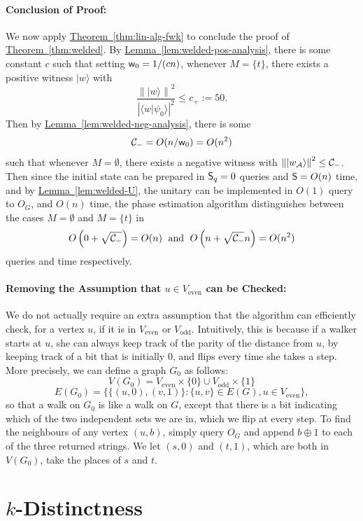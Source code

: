 \documentclass{article}
\newcommand{\thm}[1]{\hyperref[thm:#1]{Theorem~\ref*{thm:#1}}}
\newcommand{\lem}[1]{\hyperref[lem:#1]{Lemma~\ref*{lem:#1}}}
\def\ket#1{{\lvert}#1\rangle}
\renewcommand{\>}{\rangle}
\newcommand{\<}{\langle}
\renewcommand{\(}{\left(}
\renewcommand{\)}{\right)}
\def\braket#1#2{{{\langle}#1\vert}#2\rangle}
\def\norm#1{\left\| #1 \right\|}
\def\w{{\sf w}}
\begin{document}
\paragraph{Conclusion of Proof:} We now apply \thm{lin-alg-fwk} to conclude the proof of \thm{welded}. By \lem{welded-pos-analysis}, there is some constant $c$ such that setting $\w_0={1}/(cn)$, whenever $M=\{t\}$, there exists a positive witness $\ket{w}$ with 
$$\frac{\norm{\ket{w}}^2}{|\braket{w}{\psi_0}|^2}\leq c_+:=50.$$
Then by \lem{welded-neg-analysis}, there is some 
$${\cal C}_-=O(n/\w_0)=O(n^2)$$
such that whenever $M=\emptyset$, there exists a negative witness with
$\norm{\ket{w_{\cal A}}}^2 \leq {\cal C}_-$.
Then since the initial state can be prepared in ${\sf S}_q=0$ queries and ${\sf S}=O(n)$ time, and by \lem{welded-U}, the unitary can be implemented in $O(1)$ query to $O_G$, and $O(n)$ time, the phase estimation algorithm distinguishes between the cases $M=\emptyset$ and $M=\{t\}$ in 
$$O\left(0+\sqrt{{\cal C}_-}\right)=O(n)
\;\mbox{ and }\;O\left(n+\sqrt{{\cal C}_-}n\right)=O(n^2)$$
queries and time respectively.








\paragraph{Removing the Assumption that $u\in V_{\mathrm{even}}$ can be Checked:} We do not actually require an extra assumption that the algorithm can efficiently check, for a vertex $u$, if it is in $V_{\mathrm{even}}$ or $V_{\mathrm{odd}}$. Intuitively, this is because if a walker starts at $u$, she can always keep track of the parity of the distance from $u$, by keeping track of a bit that is initially 0, and flips every time she takes a step. More precisely, we can define a graph $G_0$ as follows:
$$V(G_0) = V_{\mathrm{even}}\times\{0\} \cup V_{\mathrm{odd}}\times \{1\}$$
$$E(G_0) = \{\{(u,0),(v,1)\}: \{u,v\}\in E(G), u\in V_{\mathrm{even}}\},$$
so that a walk on $G_0$ is like a walk on $G$, except that there is a bit indicating which of the two independent sets we are in, which we flip at every step. To find the neighbours of any vertex $(u,b)$, simply query $O_G$ and append $b\oplus 1$ to each of the three returned strings. We let $(s,0)$ and $(t,1)$, which are both in $V(G_0)$, take the places of $s$ and $t$. 




\section{\texorpdfstring{$k$}{k}-Distinctness}\label{sec:k-dist-full}
\end{document}
